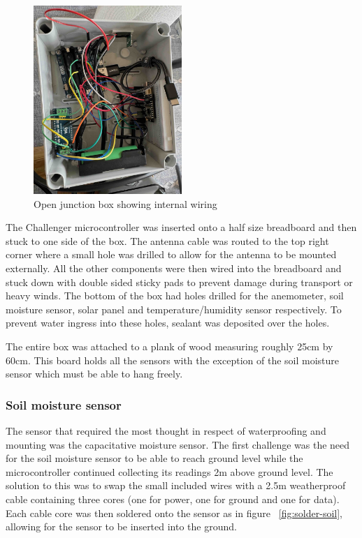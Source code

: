 \begin{figure}[H]
    \centering
    \includegraphics[width=0.5\textwidth]{contents/part-2/fig2/box-internals.jpeg}
    \caption{Open junction box showing internal wiring}
    \label{fig:box-internals}
\end{figure}

The Challenger microcontroller was inserted onto a half size breadboard and then
stuck to one side of the box. The antenna cable was routed to the top right
corner where a small hole was drilled to allow for the antenna to be mounted
externally. All the other components were then wired into the breadboard and
stuck down with double sided sticky pads to prevent damage during transport or
heavy winds. The bottom of the box had holes drilled for the anemometer, soil
moisture sensor, solar panel and temperature/humidity sensor respectively. To
prevent water ingress into these holes, sealant was deposited over the holes.

The entire box was attached to a plank of wood measuring roughly 25cm by 60cm.
This board holds all the sensors with the exception of the soil moisture sensor
which must be able to hang freely.

\subsubsection{Soil moisture sensor}

The sensor that required the most thought in respect of waterproofing and
mounting was the capacitative moisture sensor. The first challenge was the need
for the soil moisture sensor to be able to reach ground level while the
microcontroller continued collecting its readings 2m above ground level. The
solution to this was to swap the small included wires with a 2.5m weatherproof
cable containing three cores (one for power, one for ground and one for data).
Each cable core was then soldered onto the sensor as in figure
~\ref{fig:solder-soil}, allowing for the sensor to be inserted into the ground.

